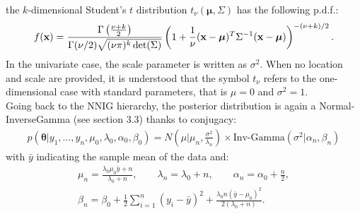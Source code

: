 the $k$-dimensional Student's $t$ distribution $t_\nu(\boldsymbol\mu, \Sigma)$ has the following p.d.f.:
$$ f(\textbf x) = \frac{\Gamma\left(\frac{\nu+k}{2}\right)}{\Gamma(\nu/2) \sqrt{(\nu\pi)^k \det(\Sigma)}} \left( 
1+\frac{1}{\nu}(\textbf x - \boldsymbol \mu)^T\Sigma^{-1}(\textbf x - \boldsymbol \mu) \right)^{-(\nu+k)/2}.
$$
In the univariate case, the scale parameter is written as $\sigma^2$.
When no location and scale are provided, it is understood that the symbol $t_\nu$ refers to the one-dimensional case with standard parameters, that is $\mu=0$ and $\sigma^2 = 1$. \\
Going back to the NNIG hierarchy, the posterior distribution is again a Normal-InverseGamma (see \cite{integral} section 3.3) thanks to conjugacy:
\begin{align*}
	p(\boldsymbol\theta|y_1,\dots,y_n,\mu_0,\lambda_0, \alpha_0, \beta_0)=N\left(\mu | \mu_n ,\frac{\sigma^2} {\lambda_n}\right) \times \text{Inv-Gamma}(\sigma^2|\alpha_n, \beta_n )
\end{align*}
with $\bar{y}$ indicating the sample mean of the data and:
\begin{gather*}
\mu_n=\frac{\lambda_0 \mu_0 \bar{y} + n}{\lambda_0 + n}, \qquad \lambda_n = \lambda_0 + n, \qquad
\alpha_n = \alpha_0 + \frac{n}{2}, \\
\beta_n= \beta_0 + \frac{1}{2}\sum_{i=1}^{n} (y_i-\bar{y})^2 + \frac{\lambda_0 n(\bar{y}-\mu_0)^2}{2(\lambda_0 + n)}.
\end{gather*}


